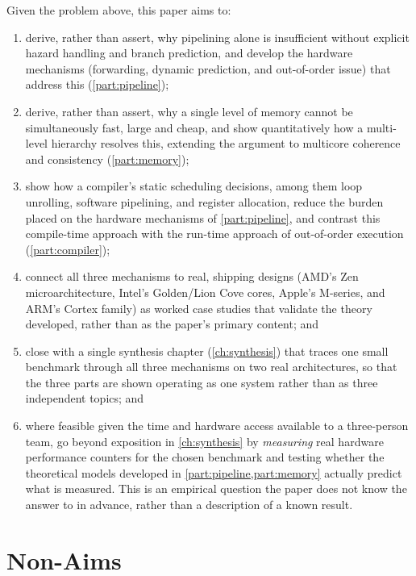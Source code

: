 \documentclass[12pt,a4paper]{report}
\begin{document}
Given the problem above, this paper aims to:
\begin{enumerate}[leftmargin=*]
  \item derive, rather than assert, why pipelining alone is insufficient
    without explicit hazard handling and branch prediction, and develop
    the hardware mechanisms (forwarding, dynamic prediction, and
    out-of-order issue) that address this (\cref{part:pipeline});
  \item derive, rather than assert, why a single level of memory cannot
    be simultaneously fast, large and cheap, and show quantitatively how
    a multi-level hierarchy resolves this, extending the argument to
    multicore coherence and consistency (\cref{part:memory});
  \item show how a compiler's static scheduling decisions, among them
    loop unrolling, software pipelining, and register allocation, reduce
    the burden placed on the hardware mechanisms of \cref{part:pipeline},
    and contrast this compile-time approach with the run-time approach of
    out-of-order execution (\cref{part:compiler});
  \item connect all three mechanisms to real, shipping designs (AMD's
    Zen microarchitecture, Intel's Golden/Lion Cove cores, Apple's
    M-series, and ARM's Cortex family) as worked case studies that
    validate the theory developed, rather than as the paper's primary
    content; and
  \item close with a single synthesis chapter (\cref{ch:synthesis}) that
    traces one small benchmark through all three mechanisms on two real
    architectures, so that the three parts are shown operating as one
    system rather than as three independent topics; and
  \item where feasible given the time and hardware access available to a
    three-person team, go beyond exposition in \cref{ch:synthesis} by
    \emph{measuring} real hardware performance counters for the chosen
    benchmark and testing whether the theoretical models developed in
    \cref{part:pipeline,part:memory} actually predict what is measured.
    This is an empirical question the paper does not know the answer to
    in advance, rather than a description of a known result.
\end{enumerate}

\section{Non-Aims}
\label{sec:non-aims}
\end{document}
